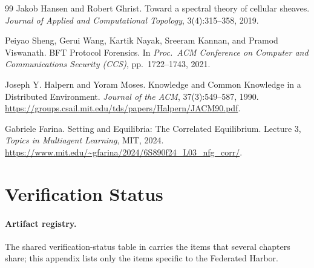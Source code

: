 \documentclass[11pt,a4paper]{article}
\theoremstyle{definition}
\theoremstyle{remark}
\begin{document}
\begin{thebibliography}{99}
Jakob Hansen and Robert Ghrist.
\newblock Toward a spectral theory of cellular sheaves.
\newblock \textit{Journal of Applied and Computational Topology}, 3(4):315--358, 2019.

Peiyao Sheng, Gerui Wang, Kartik Nayak, Sreeram Kannan, and Pramod Viswanath.
\newblock BFT Protocol Forensics.
\newblock In \textit{Proc.\ ACM Conference on Computer and Communications Security (CCS)}, pp.~1722--1743, 2021.

Joseph Y. Halpern and Yoram Moses.
\newblock Knowledge and Common Knowledge in a Distributed Environment.
\newblock \emph{Journal of the ACM}, 37(3):549--587, 1990.
\newblock \url{https://groups.csail.mit.edu/tds/papers/Halpern/JACM90.pdf}.

Gabriele Farina.
\newblock Setting and Equilibria: The Correlated Equilibrium.
\newblock Lecture 3, \emph{Topics in Multiagent Learning}, MIT, 2024.
\newblock \url{https://www.mit.edu/~gfarina/2024/6S890f24_L03_nfg_corr/}.

\end{thebibliography}

\appendix

\section{Verification Status}\label{app:fh-mech}

\paragraph{Artifact registry.} The shared verification-status table in  carries the items that several chapters share; this appendix lists only the items specific to the Federated Harbor.
\end{document}
